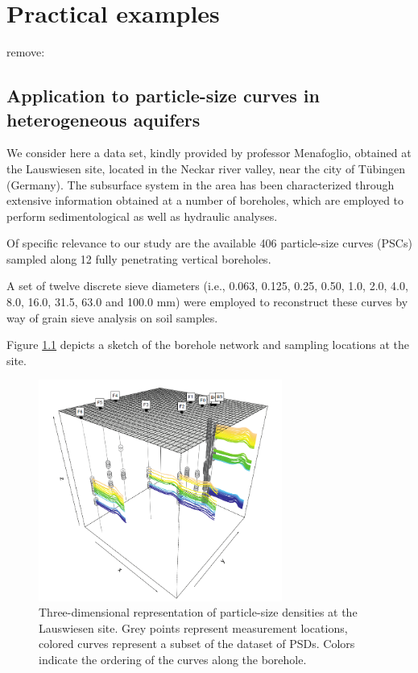 \chapter{Practical examples}
\label{chapter3}

remove: \citep{paper:pacs}

\noindent 
\section{Application to particle-size curves in heterogeneous aquifers}
We consider here a data set, kindly provided by professor Menafoglio, obtained at the Lauswiesen site, located in the Neckar river valley, near the city of T\"{u}bingen (Germany). 
The subsurface system in the area has been characterized through extensive information obtained at a number of boreholes, which are employed to perform sedimentological as well as hydraulic analyses.

Of specific relevance to our study are the available 406 particle-size curves (PSCs) sampled along 12 fully penetrating vertical boreholes.

A set of twelve discrete sieve diameters (i.e., 0.063, 0.125, 0.25, 0.50,
1.0, 2.0, 4.0, 8.0, 16.0, 31.5, 63.0 and 100.0 mm) were employed to reconstruct these curves by way of grain sieve analysis on soil samples.

Figure \ref{fig:boreholes} depicts a sketch of the borehole network and sampling locations at the site. 

\begin{figure}
	\includegraphics[width=8cm]{./pictures/particle_size_densities.png}
	\centering
	\caption{Three-dimensional representation of particle-size densities at the Lauswiesen site. Grey points represent measurement locations, colored curves represent a subset of the dataset of PSDs. Colors indicate the ordering of the curves along the borehole.}
\label{fig:boreholes}	
\end{figure}

